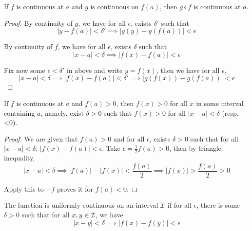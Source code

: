 \documentclass[11pt]{article}
\begin{document}
\begin{proposition}
  If \(f\) is continuous at \(a\) and \(g\) is continuous on \(f(a)\), then \(g\circ f\) is continuous at \(a\).
\end{proposition}
\begin{proof}
  By continuity of \(g\), we have for all \(\epsilon\), exists \(\delta'\) such that 
  \[|y-f(a)|<\delta'\implies|g(y)-g(f(a))|<\epsilon\]

  By continuity of \(f\), we have for all \(\epsilon\), exists \(\delta\) such that 
  \[|x-a|<\delta\implies|f(x)-f(a)|<\epsilon\]

  Fix now some \(\epsilon<\delta'\) in above and write \(y=f(x)\), then we have for all \(\epsilon\),
  \[|x-a|<\delta\implies|f(x)-f(a)|<\delta'\implies|g(f(x))-g(f(a))|<\epsilon\]
\end{proof}

\begin{proposition}
  If \(f\) is continuous at \(a\) and \(f(a)>0\), then \(f(x)>0\) for all \(x\) in some interval containing \(a\), namely, exist \(\delta>0\) such that \(f(x)>0\) for all \(|x-a|<\delta\) (resp. <0).
\end{proposition}
\begin{proof}
  We are given that \(f(a)>0\) and for all \(\epsilon\), exists \(\delta>0\) such that for all \(|x-a|<\delta\), \(|f(x)-f(a)|<\epsilon\). Take \(\epsilon=\frac{1}{2}f(a)>0\), then by triangle inequality,
  \[|x-a|<\delta \implies |f(a)|-|f(x)|<\frac{f(a)}{2}\implies |f(x)|>\frac{f(a)}{2}>0\]

  Apply this to \(-f\) proves it for \(f(a)<0\).
\end{proof}

\begin{definition}
  The function is uniformly continuous on an interval \(\cal{I}\) if for all \(\epsilon\), there is some \(\delta>0\) such that for all \(x,y\in\cal{I}\), we have 
  \[|x-y|<\delta\implies|f(x)-f(y)|<\epsilon\]  
\end{definition}
\end{document}
